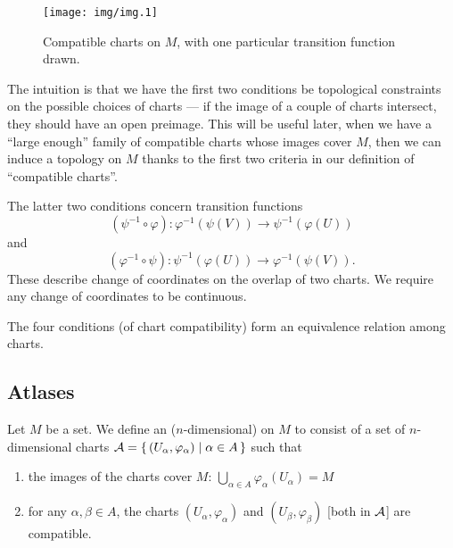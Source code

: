 \begin{figure}[H]
  \centering
  \texttt{[image: img/img.1]}
  \caption{Compatible charts on $M$, with one particular transition function drawn.}\label{fig:chart:compatibility}
\end{figure}

\begin{remark}
The intuition is that we have the first two conditions be topological
constraints on the possible choices of charts --- if the image of a
couple of charts intersect, they should have an open preimage.
This will be useful later, when we have a ``large enough'' family of
compatible charts whose images cover $M$, then we can induce a topology
on $M$ thanks to the first two criteria in our definition of
``compatible charts''.
\end{remark}

\begin{remark}
The latter two conditions concern transition functions
\begin{equation*}
(\psi^{-1}\circ\varphi)\colon\varphi^{-1}\left(\psi(V)\right)\to\psi^{-1}\left(\varphi(U)\right)
\end{equation*}
and
\begin{equation*}
(\varphi^{-1}\circ\psi)\colon\psi^{-1}\left(\varphi(U)\right)\to\varphi^{-1}\left(\psi(V)\right).
\end{equation*}
These describe change of coordinates on the overlap of two charts.
We require any change of coordinates to be continuous.
\end{remark}

\begin{remark}
The four conditions (of chart compatibility) form an equivalence relation
among charts.
\end{remark}

\subsection{Atlases}

\begin{definition}\label{defn:atlas}
Let $M$ be a set. We define an ($n$-dimensional)  on $M$
to consist of a set of $n$-dimensional charts
$\mathcal{A}=\{\,(U_{\alpha},\varphi_{\alpha})\mid\alpha\in A\,\}$
such that
\begin{enumerate}
\item the images of the charts cover $M$: $\displaystyle\bigcup_{\alpha\in{A}}\varphi_{\alpha}(U_{\alpha})=M$
\item for any $\alpha,\beta\in A$, the charts
  $(U_{\alpha},\varphi_{\alpha})$ and $(U_{\beta},\varphi_{\beta})$
  [both in $\mathcal{A}$] are compatible.
\end{enumerate}
\end{definition}

